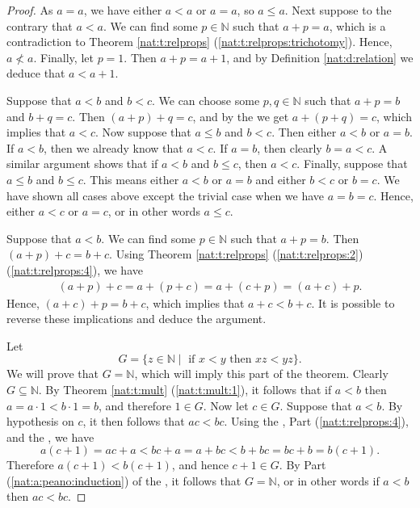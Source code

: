 \begin{proof}
	\hfill

	As $a = a$, we have either $a < a$ or $a = a$, so $a \leq a$. Next suppose to the contrary that $a < a$. We can find some $p \in \mathbb{N}$ such that $a + p = a$, which is a contradiction to Theorem \ref{nat:t:relprops} (\ref{nat:t:relprops:trichotomy}). Hence, $a \nless a$. Finally, let $p = 1$. Then $a + p = a + 1$, and by Definition \ref{nat:d:relation} we deduce that $a < a + 1$.

	Suppose that $a < b$ and $b < c$. We can choose some $p, q \in \mathbb{N}$ such that $a + p = b$ and $b + q = c$. Then $(a + p) + q = c$, and by the  we get $a + (p + q) = c$, which implies that $a < c$. Now suppose that $a \leq b$ and $b < c$. Then either $a < b$ or $a = b$. If $a < b$, then we already know that $a < c$. If $a = b$, then clearly $b = a < c$. A similar argument shows that if $a < b$ and $b \leq c$, then $a < c$. Finally, suppose that $a \leq b$ and $b \leq c$. This means either $a < b$ or $a = b$ and either $b < c$ or $b = c$. We have shown all cases above except the trivial case when we have $a = b = c$. Hence, either $a < c$ or $a = c$, or in other words $a \leq c$.

	Suppose that $a < b$. We can find some $p \in \mathbb{N}$ such that $a + p = b$. Then $(a + p) + c = b + c$. Using Theorem \ref{nat:t:relprops} (\ref{nat:t:relprops:2}) (\ref{nat:t:relprops:4}), we have
	\begin{align*}
		(a + p) + c = a + (p + c) = a + (c + p) = (a + c) + p.
	\end{align*}
	Hence, $(a + c) + p = b + c$, which implies that $a + c < b + c$. It is possible to reverse these implications and deduce the argument.

	Let
	$$
		G = \{ z \in \mathbb{N} \mid \text{ if } x < y \text{ then } x z < y z \}.
	$$
	We will prove that $G = \mathbb{N}$, which will imply this part of the theorem. Clearly $G \subseteq \mathbb{N}$. By Theorem \ref{nat:t:mult} (\ref{nat:t:mult:1}), it follows that if $a < b$ then $a = a \cdot 1 < b \cdot 1 = b$, and therefore $1 \in G$.  Now let $c \in G$. Suppose that $a < b$. By hypothesis on $c$, it then follows that $a c < b c$. Using the , Part (\ref{nat:t:relprops:4}), and the , we have
	$$
		a(c + 1) = a c + a < b c + a = a + b c < b + b c = b c + b = b(c + 1).
	$$
	Therefore $a(c + 1) < b(c + 1)$, and hence $c + 1 \in G$. By Part (\ref{nat:a:peano:induction}) of the , it follows that $G = \mathbb{N}$, or in other words if $a < b$ then $a c < b c$.


\end{proof}
